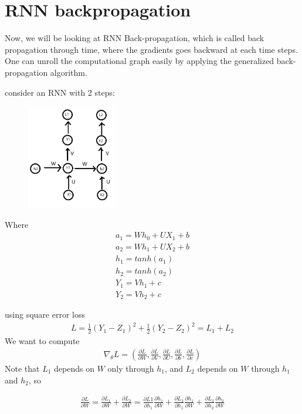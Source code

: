 \section{RNN backpropagation}
Now, we will be looking at RNN Back-propagation, which is called back propagation through time, where the gradients goes backward at each time steps. One can unroll the computational graph easily by applying the generalized back-propagation algorithm.

\begin{example}
consider an RNN with 2 steps:

\begin{figure}[H]
\centering
  \includegraphics[width=0.35\textwidth]{images/Chapter12/RNNbackprograph.png}
\end{figure}

Where 
\begin{align*}
    a_1=Wh_0+UX_1+b\\
    a_2=Wh_1+UX_2+b\\
    h_1=tanh(a_1)\\
    h_2=tanh(a_2)\\
    Y_1=Vh_1+c\\
    Y_2=Vh_2+c
\end{align*}

using square error loss
\begin{align*}
L=\frac{1}{2}(Y_1-Z_1)^2+\frac{1}{2}(Y_2-Z_2)^2=L_1+L_2
\end{align*}
We want to compute
\begin{align*}
\nabla_\theta L=(\frac{\partial L}{\partial W},\frac{\partial L}{\partial V},\frac{\partial L}{\partial U},\frac{\partial L}{\partial b},\frac{\partial L}{\partial c})
\end{align*}Note that $L_1$ depends on $W$ only through $h_1$, and $L_2$ depends on $W$ through $h_1$ and $h_2$, so

\begin{align*}
\frac{\partial L}{\partial W}=\frac{\partial L_1}{\partial W}+\frac{\partial L_2}{\partial W}=\frac{\partial L1}{\partial h_1} \frac{\partial h_1}{\partial W}+\frac{\partial L_2}{\partial h_1} \frac{\partial h_1}{\partial W}+\frac{\partial L_2 }{\partial h_2}\frac{\partial h_2}{\partial W} 
\end{align*}


\end{example}
